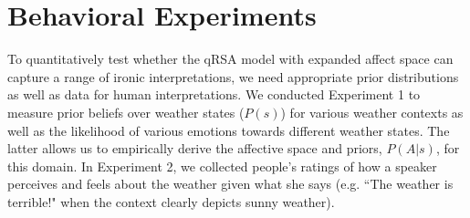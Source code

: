 \documentclass[10pt,letterpaper]{article}
\begin{document}



\section{Behavioral Experiments}
To quantitatively test whether the qRSA model with expanded affect space can capture a range of ironic interpretations, we need appropriate prior distributions as well as data for human interpretations.
We conducted Experiment 1 to measure prior beliefs over weather states ($P(s)$) for various weather contexts as well as the likelihood of various emotions towards different weather states. The latter allows us to empirically derive the affective space and priors, $P(A | s)$, for this domain.
In Experiment 2, we collected people's ratings of how a speaker perceives and feels about the weather given what she says (e.g. ``The weather is terrible!" when the context clearly depicts sunny weather).
\end{document}
